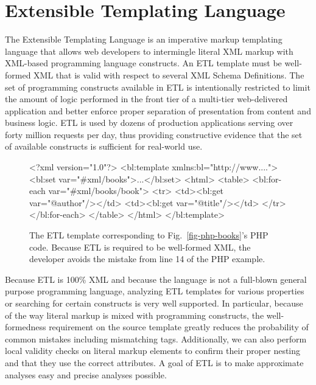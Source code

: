 \documentclass{www2003-submission}
\newcommand{\figref}[1]{Fig.~\ref{fig-#1}}
\begin{document}
\section{\hspace*{-.1in}Extensible Templating Language}
\label{sec-etl}

The Extensible Templating Language is an imperative markup templating
language that allows web developers to intermingle literal XML markup
with XML-based programming language constructs.  An ETL template must
be well-formed XML that is valid with respect to several XML Schema
Definitions.  The set of programming constructs available in ETL is
intentionally restricted to limit the amount of logic performed in the
front tier of a multi-tier web-delivered application and better
enforce proper separation of presentation from content and business
logic.  ETL is used by dozens of production applications serving over
forty million requests per day, thus providing constructive evidence
that the set of available constructs is sufficient for real-world use.

\begin{figure}[tb]
\begin{listing}{1}
<?xml version="1.0"?>
<bl:template xmlns:bl="http://www....">
 <bl:set var="#xml/books">...</bl:set>
 <html>
  <table>
   <bl:for-each var="#xml/books/book">
    <tr> 
     <td><bl:get var="@author"/></td>
     <td><bl:get var="@title"/></td>
    </tr>
   </bl:for-each>
  </table>
 </html>
</bl:template>
\end{listing}%
\caption{The ETL template corresponding to \figref{php-books}'s PHP
code. Because ETL is required to be well-formed XML, the developer
avoids the mistake from line 14 of the PHP example.
\label{fig-etl-books}}
\end{figure}

Because ETL is 100\% XML and because the language is not a full-blown
general purpose programming language, analyzing ETL templates for
various properties or searching for certain constructs is very well
supported.  In particular, because of the way literal markup is mixed
with programming constructs, the well-formedness requirement on the
source template greatly reduces the probability of common mistakes
including mismatching tags.  Additionally, we can also perform local
validity checks on literal markup elements to confirm their proper
nesting and that they use the correct attributes.  A goal of ETL is to
make approximate analyses easy and precise analyses possible.
\end{document}
